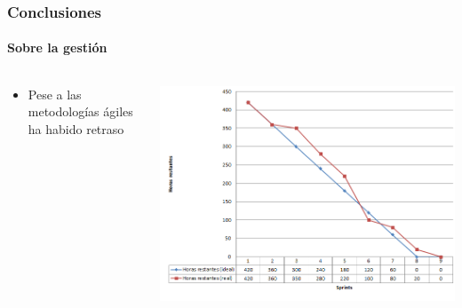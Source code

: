 \begin{frame}
	\frametitle{Conclusiones}
	\framesubtitle{Sobre la gesti\'on}
	
	\begin{columns}[T] %
		
		\begin{column}[T]{0.35\linewidth} %
			\begin{itemize}
				\item Pese a las metodolog\'ias \'agiles ha habido retraso
			\end{itemize}
		\end{column}
		
		\begin{column}[T]{0.65\linewidth} %
			\includegraphics[width=1.0\linewidth]{./Figures/burndown.png}
		\end{column}
	\end{columns}
\end{frame}

